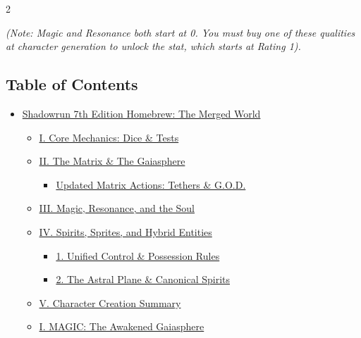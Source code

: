 \documentclass[
  oneside]{article}
\providecommand{\tightlist}{%
  \setlength{\itemsep}{0pt}\setlength{\parskip}{0pt}}
\begin{document}
\begin{multicols}{2}

\emph{(Note: Magic and Resonance both start at 0.
You must buy one of these qualities at character
generation to unlock the stat, which starts at
Rating 1).}

\hypertarget{table-of-contents}{%
\subsection{Table of
Contents}\label{table-of-contents}}

\begin{itemize}
\tightlist
\item
  \protect\hyperlink{shadowrun-7th-edition-homebrew-the-merged-world}{Shadowrun
  7th Edition Homebrew: The Merged World}

  \begin{itemize}
  \tightlist
  \item
    \protect\hyperlink{i-core-mechanics-dice--tests}{I.
    Core Mechanics: Dice \& Tests}
  \item
    \protect\hyperlink{ii-the-matrix--the-gaiasphere}{II.
    The Matrix \& The Gaiasphere}

    \begin{itemize}
    \tightlist
    \item
      \protect\hyperlink{updated-matrix-actions-tethers--god}{Updated
      Matrix Actions: Tethers \& G.O.D.}
    \end{itemize}
  \item
    \protect\hyperlink{iii-magic-resonance-and-the-soul}{III.
    Magic, Resonance, and the Soul}
  \item
    \protect\hyperlink{iv-spirits-sprites-and-hybrid-entities}{IV.
    Spirits, Sprites, and Hybrid Entities}

    \begin{itemize}
    \tightlist
    \item
      \protect\hyperlink{1-unified-control--possession-rules}{1.
      Unified Control \& Possession Rules}
    \item
      \protect\hyperlink{2-the-astral-plane--canonical-spirits}{2.
      The Astral Plane \& Canonical Spirits}
    \end{itemize}
  \item
    \protect\hyperlink{v-character-creation-summary}{V.
    Character Creation Summary}
  \item
    \protect\hyperlink{i-magic-the-awakened-gaiasphere}{I.
    MAGIC: The Awakened Gaiasphere}


\end{itemize}
\end{itemize}
\end{multicols}
\end{document}
